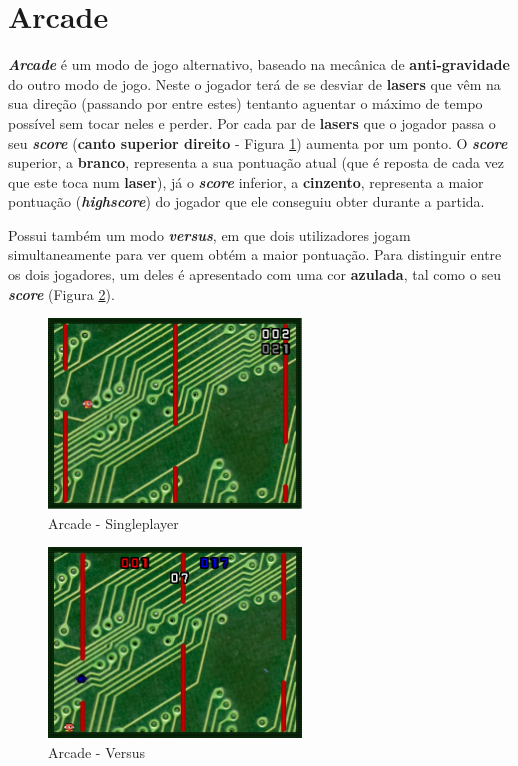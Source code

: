 \documentclass{report}
\begin{document}
\pagebreak

\section{Arcade}

\textbf{\textit{Arcade}} é um modo de jogo alternativo, baseado na mecânica de \textbf{anti-gravidade} do outro modo de jogo. Neste o jogador terá de se desviar de \textbf{lasers} que vêm na sua direção (passando por entre estes) tentanto aguentar o máximo de tempo possível sem tocar neles e perder. Por cada par de \textbf{lasers} que o jogador passa o seu \textbf{\textit{score}} (\textbf{canto superior direito} - Figura \ref{fig:arcade_singleplayer}) aumenta por um ponto. O \textbf{\textit{score}} superior, a \textbf{branco}, representa a sua pontuação atual (que é reposta de cada vez que este toca num \textbf{laser}), já o \textbf{\textit{score}} inferior, a \textbf{cinzento}, representa a maior pontuação (\textbf{\textit{highscore}}) do jogador que ele conseguiu obter durante a partida.

Possui também um modo \textbf{\textit{versus}}, em que dois utilizadores jogam simultaneamente para ver quem obtém a maior pontuação. Para distinguir entre os dois jogadores, um deles é apresentado com uma cor \textbf{azulada}, tal como o seu \textbf{\textit{score}} (Figura \ref{fig:arcade_versus}).

\begin{figure}[H]
	\centering
	\includegraphics[width=0.6\textwidth]{arcade}
	\caption{Arcade - Singleplayer}
	\label{fig:arcade_singleplayer}
\end{figure}

\begin{figure}[H]
	\centering
	\includegraphics[width=0.6\textwidth]{arcade_versus}
	\caption{Arcade - Versus}
	\label{fig:arcade_versus}
\end{figure}
\end{document}
